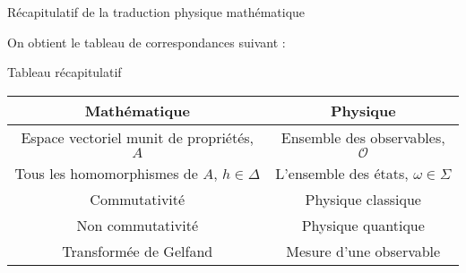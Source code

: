 \documentclass[11pt, xcolor=table]{beamer}
\begin{document}
\begin{frame}{Récapitulatif de la traduction physique mathématique}

    On obtient le tableau de correspondances suivant :
    \renewcommand{\arraystretch}{1.5}
    \setlength{\tabcolsep}{0.2cm}
    \begin{block}{Tableau récapitulatif}
        \begin{tabular}{|c|c|}
            \hline
            \textbf{Mathématique} & \textbf{Physique} \\
            \hline
            Espace vectoriel munit de propriétés, $A$ & Ensemble des observables, $\mathcal{O}$\\
            \hline
            Tous les homomorphismes de $A$, $ h \in \Delta$ & L'ensemble des états, $\omega \in \Sigma$ \\
            \hline
            Commutativité & Physique classique\\
            \hline 
            Non commutativité & Physique quantique \\
            \hline
            Transformée de Gelfand & Mesure d'une observable \\
            \hline
        \end{tabular}
    \end{block}
\end{frame} 


\nocite{*}

\begin{frame}

    
\end{frame}
\end{document}
